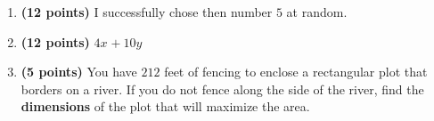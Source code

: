 \documentclass[12pt]{amsart}
\begin{document}
\begin{enumerate}
\vfill 
\def \a{7}\def \atwoone{3}\def \atwotwo{5}\def \atwothree{3}\def \btwothree{6}\def \sumtwothree{9}\def \diftwothree{-3}\def \bigtwothree{300}\def \powtwothree{216}\def \logtwothree{0.6131471927654585}\def \factortwothree{143}\def \atwofour{1.05}\def \btwofour{1.114}\def \tooshorttwofour{10.1}\def \moneytwofour{10.10}\def \longertwofour{10.10000}\def \atwofive{0.12}\def \btwofive{0.12346}\def \athreeone{6}\def \bthreeone{4}\def \setthreetwo{[12, 6, 9]}\def \athreetwo{12}\def \bthreetwo{6}\def \cthreetwo{9}\def \controlthreethree{-8}\def \athreethree{3}\def \topthreethree{0}\def \athreefour{5}\def \bthreefour{2}\def \listthreefour{[1, 2, 3, 4]}\def \afourone{8}\def \bfourone{-6}\def \fracfourone{\frac{-4}{3}}\def \rootfourtwo{8}\def \simplifiedfourtwo{2 \sqrt{2}}\def \sqrtlistfourtwo{[2, 2]}\def \outfourtwo{2}\def \infourtwo{2}\def \wowfourtwo{1}\def \afourthree{0}\def \nicethreefour{3x^{2}-x^{}}\def \nastythreefour{xyz^{3}}\def \cfourthree{-4}\def \dfourthree{10}\def \infourthree{-4x^{}}\def \outfourthree{+10y^{}}\def \afourfour{1435206}\def \nicefourfour{1,435,206}\def \goodfourfour{1,000,000.12345}\def \badfourfour{1,000,000.1}
\item {\bf (12 points)} 
 I successfully chose then number $\atwotwo$ at random. 
\vfill 
\def \a{7}\def \atwoone{3}\def \atwotwo{5}\def \atwothree{2}\def \btwothree{9}\def \sumtwothree{11}\def \diftwothree{-7}\def \bigtwothree{200}\def \powtwothree{81}\def \logtwothree{0.3154648767857287}\def \factortwothree{85}\def \atwofour{1.58}\def \btwofour{1.673}\def \tooshorttwofour{10.1}\def \moneytwofour{10.10}\def \longertwofour{10.10000}\def \atwofive{0.12}\def \btwofive{0.12346}\def \athreeone{5}\def \bthreeone{4}\def \setthreetwo{[2, 5, 6]}\def \athreetwo{2}\def \bthreetwo{5}\def \cthreetwo{6}\def \controlthreethree{4}\def \athreethree{1}\def \topthreethree{0}\def \athreefour{4}\def \bthreefour{2}\def \listthreefour{[1, 2, 3, 5]}\def \afourone{16}\def \bfourone{4}\def \fracfourone{4}\def \rootfourtwo{12}\def \simplifiedfourtwo{2 \sqrt{3}}\def \sqrtlistfourtwo{[2, 3]}\def \outfourtwo{2}\def \infourtwo{3}\def \wowfourtwo{1}\def \afourthree{5}\def \nicethreefour{3x^{2}-x^{}+5}\def \nastythreefour{xyz^{3}+5}\def \cfourthree{4}\def \dfourthree{10}\def \infourthree{4x^{}}\def \outfourthree{+10y^{}}\def \afourfour{1865628}\def \nicefourfour{1,865,628}\def \goodfourfour{1,000,000.12345}\def \badfourfour{1,000,000.1}
\item {\bf (12 points)} 
  $\infourthree \outfourthree$ 
\vfill 
\newpage\def \x{53}\def \y{106}\def \L{212}\def \area{5618}
\item {\bf (5 points)} 
 You have $\L$ feet of fencing to enclose a rectangular plot that borders on a river. If you do not fence along the side of the river, find the \textbf{dimensions} of the plot that will maximize the area. \\


\end{enumerate}
\end{document}
